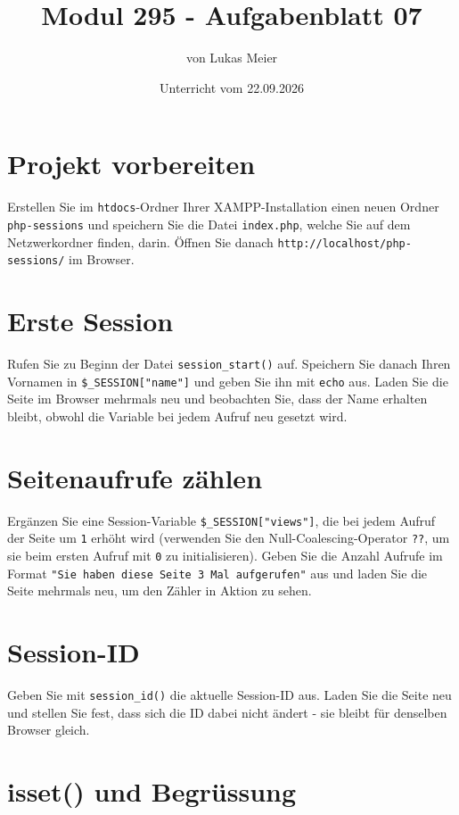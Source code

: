 \documentclass[a4paper,12pt]{article}
\title{Modul 295 - Aufgabenblatt 07}
\author{von Lukas Meier}
\date{Unterricht vom 22.09.2026}
\begin{document}
\maketitle

\section{Projekt vorbereiten}

Erstellen Sie im \texttt{htdocs}-Ordner Ihrer XAMPP-Installation einen neuen Ordner \texttt{php-sessions} und speichern Sie die Datei \texttt{index.php}, welche Sie auf dem Netzwerkordner finden, darin. Öffnen Sie danach \texttt{http://localhost/php-sessions/} im Browser.

\section{Erste Session}

Rufen Sie zu Beginn der Datei \texttt{session\_start()} auf. Speichern Sie danach Ihren Vornamen in \texttt{\$\_SESSION["{}name"{}]} und geben Sie ihn mit \texttt{echo} aus. Laden Sie die Seite im Browser mehrmals neu und beobachten Sie, dass der Name erhalten bleibt, obwohl die Variable bei jedem Aufruf neu gesetzt wird.

\section{Seitenaufrufe zählen}

Ergänzen Sie eine Session-Variable \texttt{\$\_SESSION["{}views"{}]}, die bei jedem Aufruf der Seite um \texttt{1} erhöht wird (verwenden Sie den Null-Coalescing-Operator \texttt{??}, um sie beim ersten Aufruf mit \texttt{0} zu initialisieren). Geben Sie die Anzahl Aufrufe im Format \texttt{"{}Sie haben diese Seite 3 Mal aufgerufen"{}} aus und laden Sie die Seite mehrmals neu, um den Zähler in Aktion zu sehen.

\section{Session-ID}

Geben Sie mit \texttt{session\_id()} die aktuelle Session-ID aus. Laden Sie die Seite neu und stellen Sie fest, dass sich die ID dabei nicht ändert - sie bleibt für denselben Browser gleich.

\section{isset() und Begrüssung}
\end{document}
